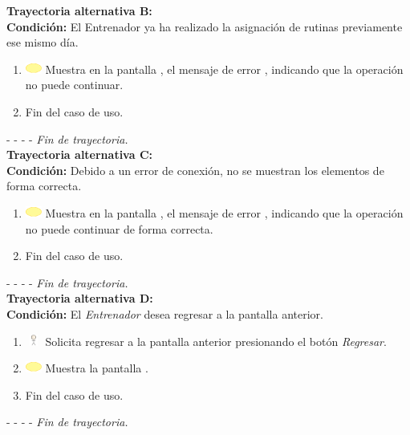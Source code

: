 \textbf{\large{Trayectoria alternativa B:}}\\
\textbf{Condición: } El Entrenador ya ha realizado la asignación de rutinas previamente ese mismo día.

\begin{enumerate}
	\item \includegraphics[width=15pt]{./Figuras/iconosCU/herramienta.png} Muestra en la pantalla , el mensaje de error , indicando que la operación no puede continuar.
	\item Fin del caso de uso.
\end{enumerate}

- - - - \textit{Fin de trayectoria.} \\

\textbf{\large{Trayectoria alternativa C:}}\\
\textbf{Condición: } Debido a un error de conexión, no se muestran los elementos de forma correcta.

\begin{enumerate}
	\item \includegraphics[width=15pt]{./Figuras/iconosCU/herramienta.png} Muestra en la pantalla , el mensaje de error , indicando que la operación no puede continuar de forma correcta.
	\item Fin del caso de uso.
\end{enumerate}

- - - - \textit{Fin de trayectoria.} \\

\textbf{\large{Trayectoria alternativa D:}}\\
\textbf{Condición: } El \textit{Entrenador} desea regresar a la pantalla anterior.

\begin{enumerate}
	\item \includegraphics[width=15pt, height=10pt]{./Figuras/iconosCU/usuario.png} Solicita regresar a la pantalla anterior presionando el botón \textit{Regresar}.
	\item \includegraphics[width=15pt]{./Figuras/iconosCU/herramienta.png} Muestra la pantalla .
	\item Fin del caso de uso.
\end{enumerate}

- - - - \textit{Fin de trayectoria.} \\

\clearpage